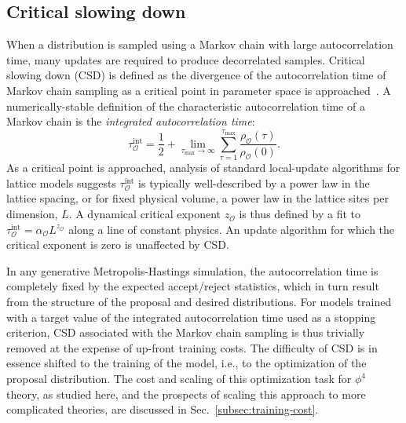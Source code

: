 \subsection{Critical slowing down}
\label{subsec:CSD-theory}

When a distribution is sampled using a Markov chain with large autocorrelation time, many updates are required to produce decorrelated samples. Critical slowing down (CSD) is defined as the divergence of the autocorrelation time of Markov chain sampling as a critical point in parameter space is approached~\cite{Wolff:1989wq}.
%
A numerically-stable definition of the characteristic autocorrelation time of a Markov chain is the \emph{integrated autocorrelation time}:
%
\begin{equation}
    \tau_\mathcal{O}^\text{int} = \frac{1}{2} + \lim_{\tau_\text{max} \rightarrow \infty}\sum_{\tau=1}^{\tau_\text{max}} \frac{\rho_\mathcal{O}(\tau)}{\rho_\mathcal{O}(0)}.
\end{equation}
As a critical point is approached, analysis of standard local-update algorithms for lattice models suggests $\tau_\mathcal{O}^\text{int}$ is typically well-described by a power law in the lattice spacing, or for fixed physical volume, a power law in the lattice sites per dimension, $L$. A dynamical critical exponent $z_\mathcal{O}$ is thus defined by a fit to $\tau_\mathcal{O}^\text{int} = \alpha_\mathcal{O} L^{z_\mathcal{O}}$ along a line of constant physics. An update algorithm for which the critical exponent is zero is unaffected by CSD.

In any generative Metropolis-Hastings simulation, the autocorrelation time is completely fixed by the expected accept/reject statistics, which in turn result from the structure of the proposal and desired distributions. For models trained with a target value of the integrated autocorrelation time used as a stopping criterion, CSD associated with the Markov chain sampling is thus trivially removed at the expense of up-front training costs. The difficulty of CSD is in essence shifted to the training of the model, i.e., to the optimization of the proposal distribution. The cost and scaling of this optimization task for $\phi^4$ theory, as studied here, and the prospects of scaling this approach to more complicated theories, are discussed in Sec.~\ref{subsec:training-cost}.
